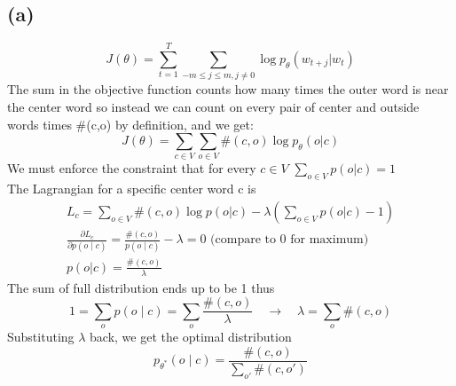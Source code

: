 \documentclass{article}
\begin{document}
\subsection*{(a)}
    $$J(\theta) = \sum_{t=1}^T \sum_{-m \le j \le m, j \ne 0}\log p_\theta(w_{t+j}|w_t)$$
The sum in the objective function counts how many times the outer word is near the center word so instead we can count on every pair of center and outside words times \#(c,o) by definition, and we get:
    $$J(\theta) = \sum_{c \in V} \sum_{o \in V}\#(c,o)\log p_{\theta}(o|c)$$
We must enforce the constraint that for every $c \in V$ $\sum_{o \in V} p(o|c) = 1$\\
The Lagrangian for a specific center word c is
\begin{gather*}
    L_c = \sum_{o \in V} \#(c,o)\log p(o|c) -\lambda \left(\sum_{o \in V} p(o|c)-1\right) \\
    \frac {\partial L_c}{\partial p(o \mid c)} = \frac{\#(c,o)}{p(o \mid c)} - \lambda = 0 \text{ (compare to 0 for maximum)} \\ 
    p(o|c)=\frac{\#(c,o)}{\lambda}
\end{gather*}
The sum of full distribution ends up to be 1 thus
    $$1=\sum_{o} p(o \mid c)=\sum_{o} \frac{\#(c,o)}{\lambda}\quad\longrightarrow\quad\lambda = \sum_{o}\#(c,o)$$
Substituting $\lambda$ back, we get the optimal distribution
    $$p_{\theta^*}(o \mid c) = \frac{\#(c,o)}{\sum_{o'} \#(c,o')}$$
\end{document}
